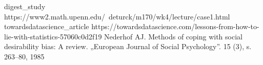 \documentclass{classrep}
\begin{document}
    \begin{thebibliography}{0}
        \bibitem
        {digest_study}
        {https://www2.math.upenn.edu/~deturck/m170/wk4/lecture/case1.html}
        \bibitem
        {towardsdatascience_article}
        {https://towardsdatascience.com/lessons-from-how-to-lie-with-statistics-57060c0d2f19}
        {Nederhof AJ. Methods of coping with social desirability bias: A review. „European Journal of Social Psychology”. 15 (3), s. 263–80, 1985}
    \end{thebibliography}
\end{document}
